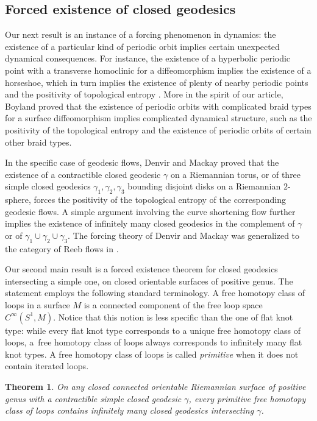 \documentclass[JEP,XML,SOM,Unicode,NoFloatCountersInSection,published]{cedram}
\theoremstyle{plain}
\newtheorem{MainThm}{Theorem}
\theoremstyle{definition}
\begin{document}
\subsection{Forced existence of closed geodesics}

Our next result is an instance of a forcing phenomenon in dynamics: the existence of a particular kind of periodic orbit implies certain unexpected dynamical consequences. For instance, the existence of a hyperbolic periodic point with a transverse homoclinic for a diffeomorphism implies the existence of a horseshoe, which in turn implies the existence of plenty of nearby periodic points and the positivity of topological entropy \cite[Th.\,6.5.5]{Katok:1995aa}. More in the spirit of our article, Boyland \cite{Boyland:1994aa} proved that the existence of periodic orbits with complicated braid types for a surface diffeomorphism implies complicated dynamical structure, such as the positivity of the topological entropy and the existence of periodic orbits of certain other braid types.

In the specific case of geodesic flows, Denvir and Mackay \cite{Denvir:1998aa} proved that the existence of a contractible closed geodesic $\gamma$ on a Riemannian torus, or of three simple closed geodesics $\gamma_1,\gamma_2,\gamma_3$ bounding disjoint disks on a Riemannian $2$-sphere, forces the positivity of the topological entropy of the corresponding geodesic flows. A simple argument involving the curve shortening flow further implies the existence of infinitely many closed geodesics in the complement of $\gamma$ or of $\gamma_1\cup\gamma_2\cup\gamma_3$. The forcing theory of Denvir and Mackay was generalized to the category of Reeb flows in \cite{Alves:2022ab,Pirnapasov:2021}.

Our second main result is a forced existence theorem for closed geodesics intersecting a simple one, on closed orientable surfaces of positive genus. The statement employs the following standard terminology.
A free homotopy class of loops in a surface $M$ is a connected component of the free loop space $C^\infty(S^1,M)$. Notice that this notion is less specific than the one of flat knot type: while every flat knot type corresponds to a unique free homotopy class of loops, a~free homotopy class of loops always corresponds to infinitely many flat knot types.
A free homotopy class of loops is called \emph{primitive} when it does not contain iterated loops.

\begin{MainThm}\label{mt:multiplicity}
On any closed connected orientable Riemannian surface of positive genus with a contractible simple closed geodesic $\gamma$, every primitive free homotopy class of loops contains infinitely many closed geodesics intersecting $\gamma$.
\end{MainThm}
\end{document}
